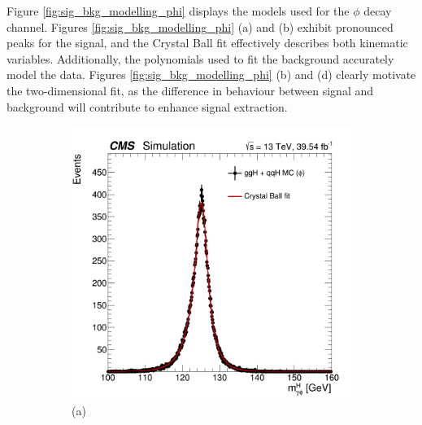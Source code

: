 Figure \ref{fig:sig_bkg_modelling_phi} displays the models used for the $\phi$ decay channel. Figures \ref{fig:sig_bkg_modelling_phi} (a) and (b) exhibit pronounced peaks for the signal, and the Crystal Ball fit effectively describes both kinematic variables. Additionally, the polynomials used to fit the background accurately model the data. Figures \ref{fig:sig_bkg_modelling_phi} (b) and (d) clearly motivate the two-dimensional fit, as the difference in behaviour between signal and background will contribute to enhance signal extraction.
\begin{figure}[!ht]
    \captionsetup[subfigure]{labelformat=empty}
    \vspace*{-0.2cm}
    \centering
    \setlength{\mylength}{\textwidth}
    \begin{subfigure}[t]{0.50\mylength}
        \centering
        \includegraphics[width=0.49\mylength]{resources/plots/Phi3_fit_SGN_MH.png}
        \vspace*{-0.2cm}
        \caption{\footnotesize (a)}
    \end{subfigure}%
    \begin{subfigure}[t]{0.50\mylength}
        \centering

\end{subfigure}
\end{figure}
